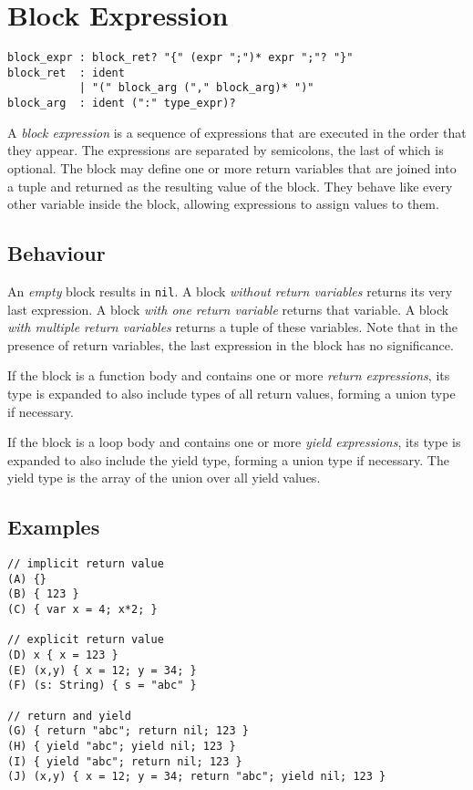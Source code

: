 \section{Block Expression}

\begin{verbatim}
block_expr : block_ret? "{" (expr ";")* expr ";"? "}"
block_ret  : ident
           | "(" block_arg ("," block_arg)* ")"
block_arg  : ident (":" type_expr)?
\end{verbatim}

A \emph{block expression} is a sequence of expressions that are executed in the
order that they appear. The expressions are separated by semicolons, the last of
which is optional. The block may define one or more return variables that are
joined into a tuple and returned as the resulting value of the block. They
behave like every other variable inside the block, allowing expressions to
assign values to them.

\subsection{Behaviour}

An \emph{empty} block results in \texttt{nil}. A block \emph{without return
variables} returns its very last expression. A block \emph{with one return
variable} returns that variable. A block \emph{with multiple return variables}
returns a tuple of these variables. Note that in the presence of return
variables, the last expression in the block has no significance.

If the block is a function body and contains one or more \emph{return
expressions}, its type is expanded to also include types of all return values,
forming a union type if necessary.

If the block is a loop body and contains one or more \emph{yield expressions},
its type is expanded to also include the yield type, forming a union type if
necessary. The yield type is the array of the union over all yield values.

\subsection{Examples}

\begin{verbatim}
// implicit return value
(A) {}
(B) { 123 }
(C) { var x = 4; x*2; }

// explicit return value
(D) x { x = 123 }
(E) (x,y) { x = 12; y = 34; }
(F) (s: String) { s = "abc" }

// return and yield
(G) { return "abc"; return nil; 123 }
(H) { yield "abc"; yield nil; 123 }
(I) { yield "abc"; return nil; 123 }
(J) (x,y) { x = 12; y = 34; return "abc"; yield nil; 123 }
\end{verbatim}

